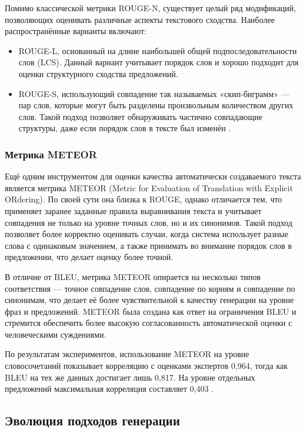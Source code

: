 \documentclass[coursework]{SCWorks}
\begin{document}
    Помимо классической метрики ROUGE-N, существует целый ряд модификаций, позволяющих оценивать различные аспекты текстового сходства.
    Наиболее распространённые варианты включают:
    \begin{itemize}
        \item {ROUGE-L}, основанный на длине наибольшей общей подпоследовательности слов (LCS). Данный вариант учитывает порядок слов и хорошо подходит для оценки структурного сходства предложений.
        \item {ROUGE-S}, использующий совпадение так называемых «скип-биграмм» — пар слов, которые могут быть разделены произвольным количеством других слов.
        Такой подход позволяет обнаруживать частично совпадающие структуры, даже если порядок слов в тексте был изменён \cite{Bidzhieva2024}.
    \end{itemize}

    \subsubsection{Метрика METEOR}


    Ещё одним инструментом для оценки качества автоматически создаваемого текста является метрика {METEOR}
    (Metric for Evaluation of Translation with Explicit ORdering).
    По своей сути она близка к ROUGE, однако отличается тем, что применяет заранее заданные правила выравнивания текста и
    учитывает совпадения не только на уровне точных слов, но и их синонимов.
    Такой подход позволяет более корректно оценивать случаи, когда система использует разные слова с одинаковым значением,
    а также принимать во внимание порядок слов в предложении, что делает оценку более точной.

    В отличие от BLEU, метрика METEOR опирается на несколько типов соответствия — точное совпадение слов, совпадение по корням и
    совпадение по синонимам, что делает её более чувствительной к качеству генерации на уровне фраз и предложений.
    METEOR была создана как ответ на ограничения BLEU и стремится обеспечить более высокую согласованность автоматической оценки
    с человеческими суждениями.

    По результатам экспериментов, использование METEOR на уровне словосочетаний показывает корреляцию с оценками экспертов
            {0,964}, тогда как BLEU на тех же данных достигает лишь {0,817}.
    На уровне отдельных предложений максимальная корреляция составляет {0,403} \cite{Bidzhieva2024, banarjee2005}.

    \subsection{Эволюция подходов генерации}
\end{document}
